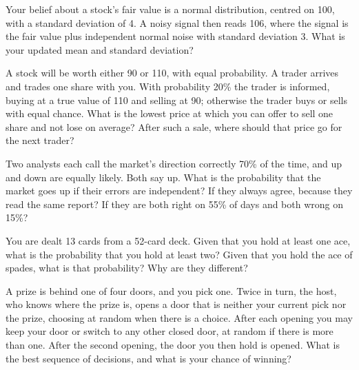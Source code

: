 \begin{question}\label{iq:iv1:conditional-probability-and-bayes:25}
Your belief about a stock's fair value is a normal distribution, centred on 100, with a standard deviation of 4. A noisy signal then reads 106, where the signal is the fair value plus independent normal noise with standard deviation 3. What is your updated mean and standard deviation?
\end{question}

\begin{question}\label{iq:iv1:conditional-probability-and-bayes:26}
A stock will be worth either 90 or 110, with equal probability. A trader arrives and trades one share with you. With probability 20\% the trader is informed, buying at a true value of 110 and selling at 90; otherwise the trader buys or sells with equal chance. What is the lowest price at which you can offer to sell one share and not lose on average? After such a sale, where should that price go for the next trader?
\end{question}

\begin{question}\label{iq:iv1:conditional-probability-and-bayes:27}
Two analysts each call the market's direction correctly 70\% of the time, and up and down are equally likely. Both say up. What is the probability that the market goes up if their errors are independent? If they always agree, because they read the same report? If they are both right on 55\% of days and both wrong on 15\%?
\end{question}

\begin{question}\label{iq:iv1:conditional-probability-and-bayes:28}
You are dealt 13 cards from a 52-card deck. Given that you hold at least one ace, what is the probability that you hold at least two? Given that you hold the ace of spades, what is that probability? Why are they different?
\end{question}

\begin{question}\label{iq:iv1:conditional-probability-and-bayes:29}
A prize is behind one of four doors, and you pick one. Twice in turn, the host, who knows where the prize is, opens a door that is neither your current pick nor the prize, choosing at random when there is a choice. After each opening you may keep your door or switch to any other closed door, at random if there is more than one. After the second opening, the door you then hold is opened. What is the best sequence of decisions, and what is your chance of winning?
\end{question}

